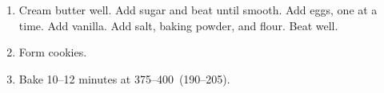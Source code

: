 
\begin{ingredients}
\end{ingredients}


\begin{recipe}
  \begin{enumerate}
  \item Cream butter well.  Add sugar and beat until smooth.
    Add eggs, one at a time.  Add vanilla.  Add salt, baking powder,
    and flour.  Beat well.

  \item Form cookies.

  \item Bake 10--12 minutes at 375--400\F\ (190--205\degreeC).

  \end{enumerate}
\end{recipe}
